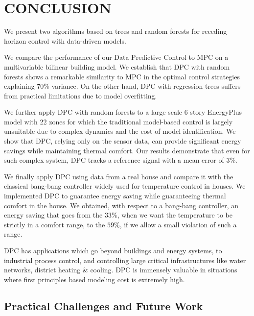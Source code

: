 \section{CONCLUSION}
\label{S:conclusion}

We present two algorithms based on trees and random forests for receding horizon control with data-driven models.

We compare the performance of our Data Predictive Control to MPC on a multivariable bilinear building model. We establish that DPC with random forests shows a remarkable similarity to MPC in the optimal control strategies explaining 70\% variance. On the other hand, DPC with regression trees suffers from practical limitations due to model overfitting.

We further apply DPC with random forests to a large scale 6 story EnergyPlus model with 22 zones for which the traditional model-based control is largely unsuitable due to complex dynamics and the cost of model identification. We show that DPC, relying only on the sensor data, can provide significant energy savings while maintaining thermal comfort. Our results demonstrate that even for such complex system, DPC tracks a reference signal with a mean error of 3\%.

We finally apply DPC using data from a real house and compare it with the classical bang-bang controller widely used for temperature control in houses. We implemented DPC to guarantee energy saving while guaranteeing thermal comfort in the house. We obtained, with respect to a bang-bang controller, an energy saving that goes from the $33\%$, when we want the temperature to be strictly in a comfort range, to the $59\%$, if we allow a small violation of such a range.

DPC has applications which go beyond buildings and energy systems, to industrial process control, and controlling large critical infrastructures like water networks, district heating \& cooling. DPC is immensely valuable in situations where first principles based modeling cost is extremely high.

\subsection{Practical Challenges and Future Work}
\label{SS:challenges}
